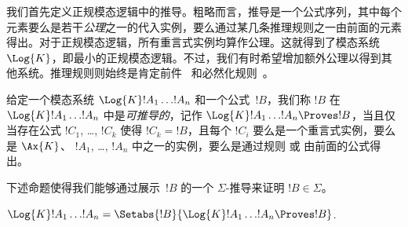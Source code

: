 \documentclass[../../../include/open-logic-section]{subfiles}
\begin{document}


我们首先定义正规模态逻辑中的推导。粗略而言，推导是一个公式序列，其中每个元素要么是若干\emph{公理}之一的代入实例，要么通过某几条推理规则之一由前面的元素得出。对于正规模态逻辑，所有重言式实例均算作公理。这就得到了模态系统~$\Log{K}$，即最小的正规模态逻辑。不过，我们有时希望增加额外公理以得到其他系统。推理规则则始终是肯定前件~\MP{} 和必然化规则~\Nec。

\begin{defn}
  给定一个模态系统 $\Log{K} !A_1 \dots !A_n$ 和一个公式~$!B$，我们称 $!B$ 在 $\Log{K} !A_1 \dots
  !A_n$ 中是\emph{可推导的}，记作 $\Log{K} !A_1 \dots !A_n \Proves !B$，当且仅当存在公式 $!C_1$, \dots, $!C_k$ 使得 $!C_k = !B$，且每个 $!C_i$ 要么是一个重言式实例，要么是 $\Ax{K}$、 $!A_1$, \dots, $!A_n$ 中之一的实例，要么是通过规则 \MP{} 或 \Nec 由前面的公式得出。
\end{defn}

下述命题使得我们能够通过展示~$!B$ 的一个 $\Sigma$-推导来证明 $!B \in \Sigma$。

\begin{prop}
  $\Log{K} !A_1 \dots !A_n = \Setabs{!B}{\Log{K} !A_1 \dots !A_n \Proves !B}$.
\end{prop}
\end{document}
